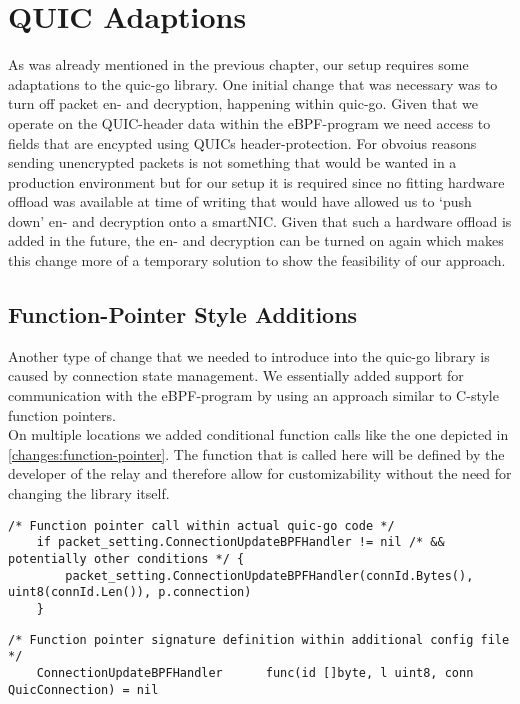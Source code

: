 \section{QUIC Adaptions}\label{sec:quic_adaptions}
As was already mentioned in the previous chapter, our setup requires some adaptations
to the quic-go library.
One initial change that was necessary was to turn off packet en- and decryption, 
happening within quic-go.
Given that we operate on the QUIC-header data within the eBPF-program we need access 
to fields that are encypted using QUICs header-protection.
For obvoius reasons sending unencrypted packets is not something that would be wanted in 
a production environment but for our setup it is required since no fitting hardware offload 
was available at time of writing that would have allowed us to `push down' en- and decryption 
onto a smartNIC\@.
Given that such a hardware offload is added in the future, the en- and decryption can be
turned on again which makes this change more of a temporary solution to show the feasibility
of our approach.

\subsection{Function-Pointer Style Additions}
Another type of change that we needed to introduce into the quic-go library is caused by 
connection state management.
We essentially added support for communication with the eBPF-program by using an 
approach similar to C-style function pointers.
\\
On multiple locations we added conditional function calls like the one depicted in 
\autoref{changes:function-pointer}.
The function that is called here will be defined by the developer of the relay and 
therefore allow for customizability without the need for changing the library itself.
\vspace{0.2cm}
\begin{lstlisting}[style=GoStyle, label=changes:function-pointer, caption=An example of a function-pointer addition to the quic-go library.]
    /* Function pointer call within actual quic-go code */
    if packet_setting.ConnectionUpdateBPFHandler != nil /* && potentially other conditions */ {
	    packet_setting.ConnectionUpdateBPFHandler(connId.Bytes(), uint8(connId.Len()), p.connection)
	}
\end{lstlisting}
\vspace{0.2cm}
\begin{lstlisting}[style=GoStyle, label=changes:signature-function-pointer, caption=Only the signature will be defined within the library itself.]
    /* Function pointer signature definition within additional config file */
	ConnectionUpdateBPFHandler      func(id []byte, l uint8, conn QuicConnection) = nil
\end{lstlisting}

